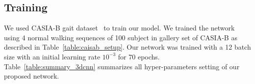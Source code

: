 \subsection{Training}
We used CASIA-B gait dataset~\cite{Yu_06} to train our model. We trained the network using 4 normal walking sequences of 100 subject in gallery set of CASIA-B as described in Table~\ref{table:caisab_setup}. Our network was trained with a 12 batch size with an initial learning rate ${10^{-3}}$ for 70 epochs. Table~\ref{table:summary_3dcnn} summarizes all hyper-parameters setting of our proposed network.

\endinput